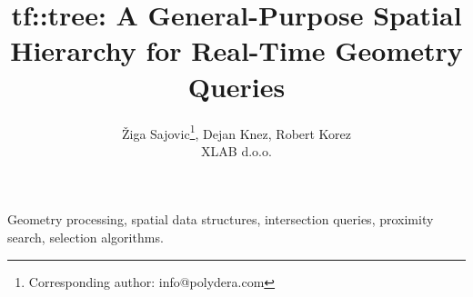 


\title{tf::tree: A General-Purpose Spatial Hierarchy for Real-Time Geometry Queries}
\author{Žiga Sajovic\thanks{Corresponding author: info@polydera.com}, Dejan Knez, Robert Korez\\ XLAB d.o.o.}
\date{}


\maketitle



\begin{IEEEkeywords}
Geometry processing, spatial data structures,
intersection queries, proximity search,
selection algorithms.
\end{IEEEkeywords}









